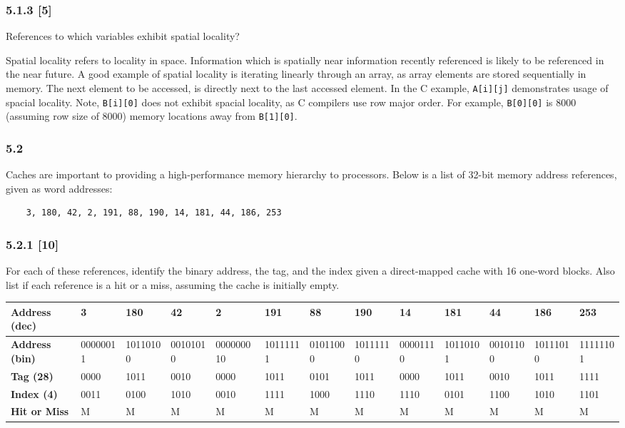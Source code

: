 \documentclass[fleqn]{article}
\begin{document}
\subsubsection*{5.1.3 [5] \textrangle} References to which variables exhibit spatial locality?
\begin{addmargin}[0.15cm]{0cm}
    Spatial locality refers to locality in space. Information which is spatially near information recently referenced is likely to be referenced in the near future. 
    A good example of spatial locality is iterating linearly through an array, as array elements are stored sequentially in memory. The next element to be accessed, is directly next to the last accessed element. In the C example, \verb|A[i][j]| demonstrates usage of spacial locality. 
    Note, \verb|B[i][0]| does not exhibit spacial locality, as C compilers use row major order. For example, \verb|B[0][0]| is $8000$ (assuming row size of $8000$) memory locations away from \verb|B[1][0]|.
\end{addmargin}

\subsubsection*{5.2} Caches are important to providing a high-performance memory hierarchy to processors. Below is a list of 32-bit memory address references, given as word addresses:
\begin{verbatim}
    3, 180, 42, 2, 191, 88, 190, 14, 181, 44, 186, 253
\end{verbatim}

\subsubsection*{5.2.1 [10] \textrangle} For each of these references, identify the binary address, the tag, and the index given a direct-mapped cache with 16 one-word blocks. Also list if each reference is a hit or a miss, assuming the cache is initially empty.
\begin{table}[H]
    \setlength{\tabcolsep}{3pt}
    \fontsize{6pt}{12pt}\selectfont
    \begin{tabular}{l|l|l|l|l|l|l|l|l|l|l|l|l}
    \textbf{Address (dec)} & \textbf{3} & \textbf{180} & \textbf{42} & \textbf{2} & \textbf{191} & \textbf{88} & \textbf{190} & \textbf{14} & \textbf{181} & \textbf{44} & \textbf{186} & \textbf{253} \\ \hline
    \textbf{Address (bin)} & 00000011 & 10110100 & 00101010 & 000000010 & 10111111 & 01011000 & 10111110 & 00001110 & 10110101 & 00101100 & 10111010 & 11111101 \\ 
    \textbf{Tag (28)} & 0000 & 1011 & 0010 & 0000 & 1011 & 0101 & 1011 & 0000 & 1011 & 0010 & 1011 & 1111 \\ 
    \textbf{Index (4)} & 0011 & 0100 & 1010 & 0010 & 1111 & 1000 & 1110 & 1110 & 0101 & 1100 & 1010 & 1101 \\ 
    \textbf{Hit or Miss} & M & M & M & M & M & M & M & M & M & M & M & M \\ 
    \end{tabular}
\end{table}
\end{document}
